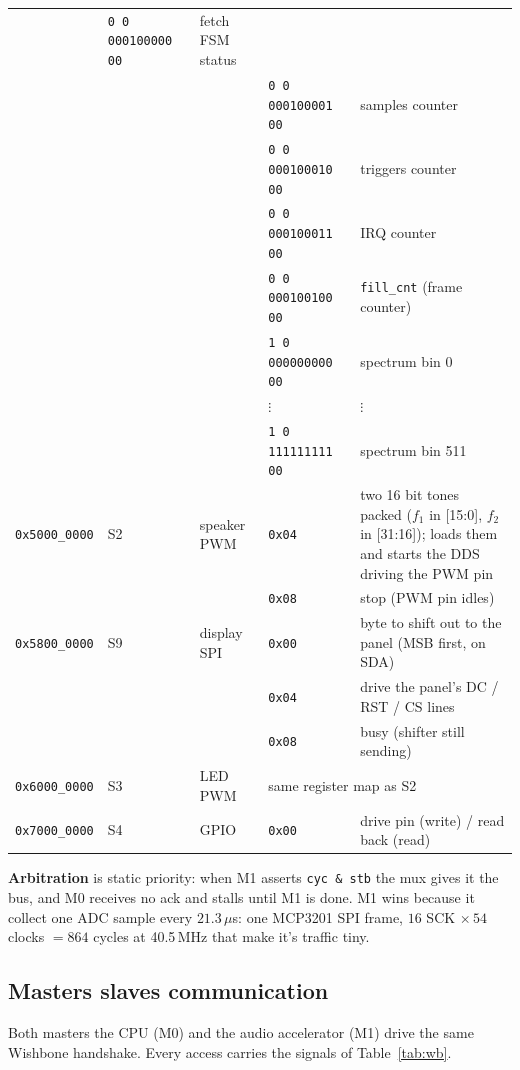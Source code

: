 \documentclass[a4paper,10pt]{article}
\begin{document}
{\begin{longtable}{l l l l p{6.7cm}}
 & \texttt{0\,0\,000100000\,00} & fetch FSM status \\
 & & & \texttt{0\,0\,000100001\,00} & samples counter \\
 & & & \texttt{0\,0\,000100010\,00} & triggers counter \\
 & & & \texttt{0\,0\,000100011\,00} & IRQ counter \\
 & & & \texttt{0\,0\,000100100\,00} & \texttt{fill\_cnt} (frame counter) \\
 & & & \texttt{1\,0\,000000000\,00} & spectrum bin 0 \\
 & & & $\vdots$ & $\vdots$ \\
 & & & \texttt{1\,0\,111111111\,00} & spectrum bin 511 \\
\midrule
\texttt{0x5000\_0000} & S2 & speaker PWM
 & \texttt{0x04} & two 16 bit tones packed ($f_1$ in [15:0], $f_2$ in [31:16]);
 loads them and starts the DDS driving the PWM pin \\
 & & & \texttt{0x08} & stop (PWM pin idles) \\
\midrule
\texttt{0x5800\_0000} & S9 & display SPI
 & \texttt{0x00} & byte to shift out to the panel (MSB first, on SDA) \\
 & & & \texttt{0x04} & drive the panel's DC / RST / CS lines \\
 & & & \texttt{0x08} & busy (shifter still sending) \\
\midrule
\texttt{0x6000\_0000} & S3 & LED PWM & \multicolumn{2}{l}{same register map as S2} \\
\midrule
\texttt{0x7000\_0000} & S4 & GPIO & \texttt{0x00} & drive pin (write) / read back (read) \\
\end{longtable}
}

\textbf{Arbitration} is static priority: when M1 asserts
\texttt{cyc\,\&\,stb} the mux gives it the bus, and M0 receives no ack and
stalls until M1 is done. M1 wins because it collect
one ADC sample every $21.3\,\mu$s: one MCP3201 SPI frame, $16$ SCK $\times\,54$
clocks $=864$ cycles at 40.5\,MHz that make it's traffic tiny.

\subsection{Masters slaves communication}
\label{sec:wbrules}

Both masters the CPU (M0) and the audio accelerator (M1) drive the same
Wishbone handshake. Every access carries the signals of
Table~\ref{tab:wb}.
\end{document}
